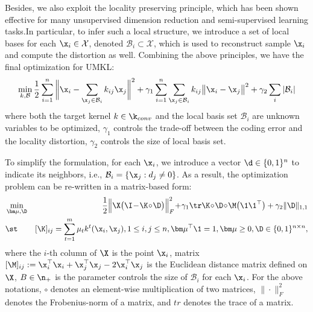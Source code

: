 Besides, we also exploit the locality preserving principle, which has been shown effective for many unsupervised dimension reduction and semi-supervised learning tasks.In particular, to infer such a local structure, we introduce a set of local bases for each $\x_i\in\mathcal X$, denoted $\mathcal B_i\subset\mathcal X$, which is used to reconstruct sample $\x_i$ and compute the distortion as well. Combining the above principles, we have the final optimization for UMKL:
\begin{eqnarray}
\min_{k, \mathcal B} \frac{1}{2}\sum_{i=1}^n \bigg\| \x_i - \sum_{\x_j\in\mathcal B_i} k_{ij}\x_j \bigg\|^2 + \gamma_1\sum_{i=1}^n\sum_{\x_j\in\mathcal B_i} k_{ij}\big\| \x_i - \x_j \big\|^2 + \gamma_2\sum_i| \mathcal B_i |
\end{eqnarray}
where both the target kernel $k\in \k_{conv}$ and the local basis set $\mathcal B_i$ are unknown variables to be optimized, $\gamma_1$ controls the trade-off between the coding error and the locality distortion, $\gamma_2$ controls the size of local basis set.

To simplify the formulation, for each $\x_i$, we introduce a vector $\d \in\{0,1\}^n$ to indicate its neighbors, i.e., $\mathcal B_i =\{\x_j: d_j\neq0\}$. As a result, the optimization problem can be re-written in a matrix-based form:
\begin{eqnarray}
\hspace{0cm}&\min_{\bm\mu,\D}& \!\!\!\!\frac{1}{2} \Big\| \X \big(\I \!-\! \K\!\circ\!\D\big) \Big\|^2_F \!+\! \gamma_1\tr\K\!\circ\!\D\!\circ\!\M\big(\1\1^\top\big) + \gamma_2 \| \D \|_{1,1} \label{eqn:obj}\\
\hspace{0cm}&\st& [\K]_{ij}=\sum_{t=1}^m\mu_tk^t(\x_i, \x_j), 1\leq i, j \leq n, \bm\mu^\top\1 = 1, \bm\mu\geq 0, \D\in\{0,1\}^{n\times n} \nonumber,
\end{eqnarray}
where the $i$-th column of $\X$ is the point $\x_i$, matrix $[\M]_{ij} := \x_i^\top\x_i+\x_j^\top\x_j - 2\x_i^\top\x_j$ is the Euclidean distance matrix defined on $\X$, $B\in\n_+$ is the parameter controls the size of $\mathcal B_i$ for each $\x_i$. For the above notations, $\circ$ denotes an element-wise multiplication of two matrices, $\|\cdot\|^2_F$ denotes the Frobenius-norm of a matrix, and $tr$ denotes the trace of a matrix.

